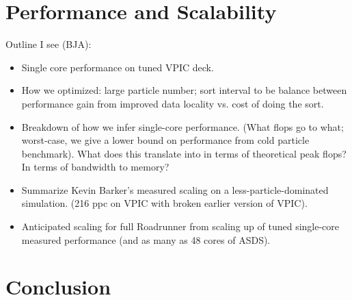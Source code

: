 \documentclass[letter,10pt]{article}
\begin{document}
\section*{Performance and Scalability}

Outline I see (BJA):  
\begin{itemize}
\item Single core performance on tuned VPIC deck.  

\item How we optimized:  large particle number; sort interval to be 
balance between performance gain from improved data locality vs. 
cost of doing the sort. 

\item Breakdown of how we infer single-core performance.  (What flops go to 
what; worst-case, we give a lower bound on performance from cold particle
benchmark).  What does this translate into in terms of theoretical peak 
flops?  In terms of bandwidth to memory? 

\item Summarize Kevin Barker's measured scaling on a less-particle-dominated 
simulation.  (216 ppc on VPIC with broken earlier version of VPIC). 

\item Anticipated scaling for full Roadrunner from scaling up of tuned 
single-core measured performance (and as many as 48 cores of ASDS).  

\end{itemize}

\section*{Conclusion}









\end{document}
